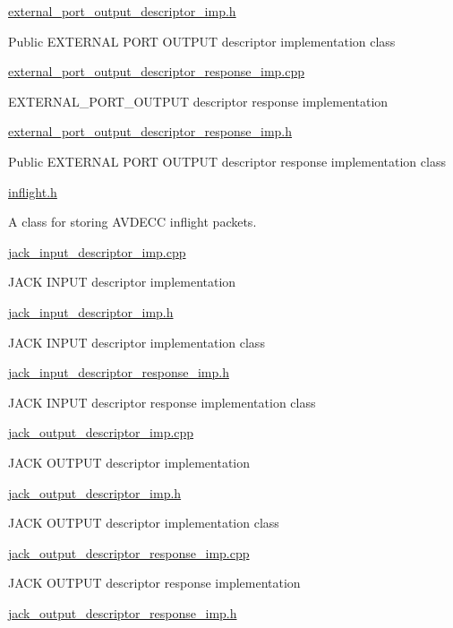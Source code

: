 \hyperlink{external__port__output__descriptor__imp_8h}{external\+\_\+port\+\_\+output\+\_\+descriptor\+\_\+imp.\+h}

Public E\+X\+T\+E\+R\+N\+AL P\+O\+RT O\+U\+T\+P\+UT descriptor implementation class

\hyperlink{external__port__output__descriptor__response__imp_8cpp}{external\+\_\+port\+\_\+output\+\_\+descriptor\+\_\+response\+\_\+imp.\+cpp}

E\+X\+T\+E\+R\+N\+A\+L\+\_\+\+P\+O\+R\+T\+\_\+\+O\+U\+T\+P\+UT descriptor response implementation

\hyperlink{external__port__output__descriptor__response__imp_8h}{external\+\_\+port\+\_\+output\+\_\+descriptor\+\_\+response\+\_\+imp.\+h}

Public E\+X\+T\+E\+R\+N\+AL P\+O\+RT O\+U\+T\+P\+UT descriptor response implementation class

\hyperlink{inflight_8h}{inflight.\+h}

A class for storing A\+V\+D\+E\+CC inflight packets.

\hyperlink{jack__input__descriptor__imp_8cpp}{jack\+\_\+input\+\_\+descriptor\+\_\+imp.\+cpp}

J\+A\+CK I\+N\+P\+UT descriptor implementation

\hyperlink{jack__input__descriptor__imp_8h}{jack\+\_\+input\+\_\+descriptor\+\_\+imp.\+h}

J\+A\+CK I\+N\+P\+UT descriptor implementation class

\hyperlink{jack__input__descriptor__response__imp_8h}{jack\+\_\+input\+\_\+descriptor\+\_\+response\+\_\+imp.\+h}

J\+A\+CK I\+N\+P\+UT descriptor response implementation class

\hyperlink{jack__output__descriptor__imp_8cpp}{jack\+\_\+output\+\_\+descriptor\+\_\+imp.\+cpp}

J\+A\+CK O\+U\+T\+P\+UT descriptor implementation

\hyperlink{jack__output__descriptor__imp_8h}{jack\+\_\+output\+\_\+descriptor\+\_\+imp.\+h}

J\+A\+CK O\+U\+T\+P\+UT descriptor implementation class

\hyperlink{jack__output__descriptor__response__imp_8cpp}{jack\+\_\+output\+\_\+descriptor\+\_\+response\+\_\+imp.\+cpp}

J\+A\+CK O\+U\+T\+P\+UT descriptor response implementation

\hyperlink{jack__output__descriptor__response__imp_8h}{jack\+\_\+output\+\_\+descriptor\+\_\+response\+\_\+imp.\+h}

